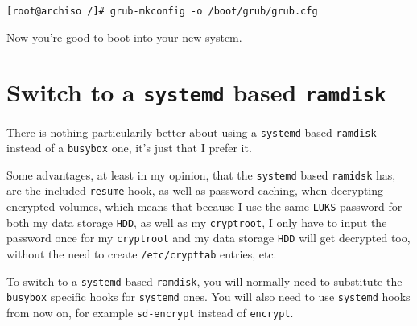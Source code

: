 \documentclass[9pt]{report}
\newenvironment{NOTE}
{\begin{tcolorbox}[colback=admonitionBG,coltitle=draculaFG,colframe=draculaBlue,colbacktitle=draculaBlue,title=NOTE]}
{\end{tcolorbox}}
\begin{document}
\begin{verbatim}
[root@archiso /]# grub-mkconfig -o /boot/grub/grub.cfg
\end{verbatim}

Now you’re good to boot into your new system.



\newpage

\hypertarget{x-switch-to-a-systemd-based-ramdisk}{\section{Switch to a \texttt{systemd} based \texttt{ramdisk}}}
\begin{NOTE}
    There is nothing particularily better about using a \texttt{systemd} based \texttt{ramdisk} instead of a \texttt{busybox} one, it’s just that I prefer it.


    Some advantages, at least in my opinion, that the \texttt{systemd} based \texttt{ramidsk} has, are the included \texttt{resume} hook, as well as password caching, when decrypting encrypted volumes, which means that because I use the same \texttt{LUKS} password for both my data storage \texttt{HDD}, as well as my \texttt{cryptroot}, I only have to input the password once for my \texttt{cryptroot} and my data storage \texttt{HDD} will get decrypted too, without the need to create \texttt{/etc/crypttab} entries, etc.

\end{NOTE}
To switch to a \texttt{systemd} based \texttt{ramdisk}, you will normally need to substitute the \texttt{busybox} specific hooks for \texttt{systemd} ones.
You will also need to use \texttt{systemd} hooks from now on, for example \texttt{sd-encrypt} instead of \texttt{encrypt}.
\end{document}

